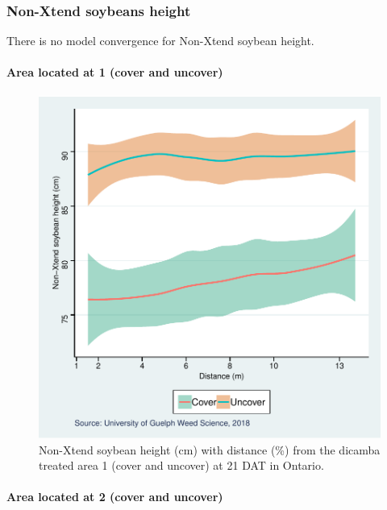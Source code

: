 \documentclass[]{article}
\let\oldparagraph\paragraph
\renewcommand{\paragraph}[1]{\oldparagraph{#1}\mbox{}}
\begin{document}
\subsubsection{Non-Xtend soybeans
height}\label{non-xtend-soybeans-height-5}

There is no model convergence for Non-Xtend soybean height.

\paragraph{Area located at 1 (cover and
uncover)}\label{area-located-at-1-cover-and-uncover-1}

\begin{figure}
\centering
\includegraphics{Report_Dicamba_study_files/figure-latex/unnamed-chunk-85-1.pdf}
\caption{Non-Xtend soybean height (cm) with distance (\%) from the
dicamba treated area 1 (cover and uncover) at 21 DAT in Ontario.}
\end{figure}

\newpage

\pagebreak

\paragraph{Area located at 2 (cover and
uncover)}\label{area-located-at-2-cover-and-uncover-1}
\end{document}
